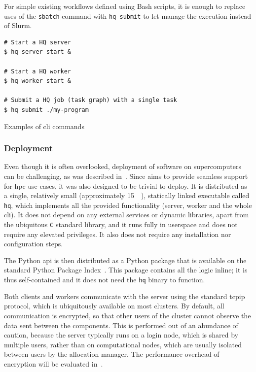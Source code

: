 For simple existing workflows defined using Bash scripts, it is enough to replace uses of the
\texttt{sbatch} command with \texttt{hq submit} to let \hyperqueue{} manage
the execution instead of Slurm.

\begin{listing}[h]
	\begin{verbatim}
# Start a HQ server
$ hq server start &

# Start a HQ worker
$ hq worker start &

# Submit a HQ job (task graph) with a single task
$ hq submit ./my-program
	\end{verbatim}
	\caption{Examples of \hyperqueue{} \gls{cli} commands}
	\label{lst:hq-cli-commands}
\end{listing}

\subsubsection*{Deployment}
Even though it is often overlooked, deployment of software on supercomputers can be challenging, as
was described in~. Since \hyperqueue{} aims to provide seamless
support for \gls{hpc} use-cases, it was also designed to be trivial to deploy. It is
distributed as a single, relatively small (approximately \SI{15}{\mebi\byte}), statically
linked executable called \texttt{hq}, which implements all the provided functionality
(server, worker and the whole \gls{cli}). It does not depend on any external services
or dynamic libraries, apart from the ubiquitous \texttt{C} standard library, and it
runs fully in userspace and does not require any elevated privileges. It also does not require any
installation nor configuration steps.

The \hyperqueue{} Python \gls{api} is then distributed as a Python package
that is available on the standard Python Package Index~\cite{hq_pypi}. This package
contains all the \hq{} logic inline; it is thus self-contained and it does not
need the \texttt{hq} binary to function.

Both clients and workers communicate with the server using the standard \gls{tcpip}
protocol, which is ubiquitously available on most clusters. By default, all communication is
encrypted, so that other users of the cluster cannot observe the data sent between the
\hyperqueue{} components. This is performed out of an abundance of caution, because the
server typically runs on a login node, which is shared by multiple users, rather than on
computational nodes, which are usually isolated between users by the allocation manager. The
performance overhead of encryption will be evaluated in~.

